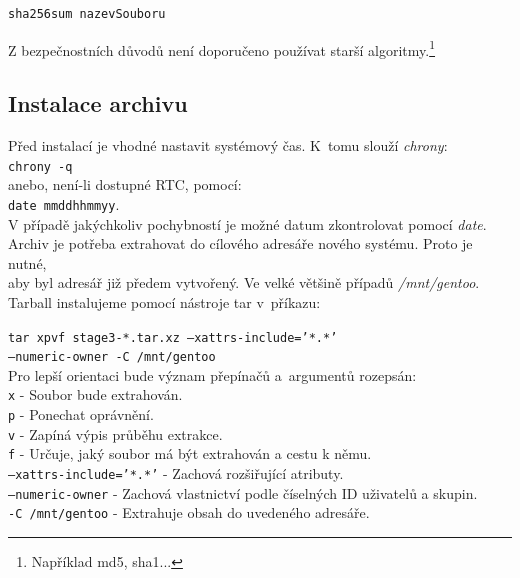 \documentclass[12pt,a4paper,twoside,]{article}
\begin{document}
{{{{{{{\texttt{sha256sum nazevSouboru}

\hspace{-1.5em}Z bezpečnostních důvodů není doporučeno používat starší algoritmy.\footnote{Například md5, sha1...}

\newpage
\subsection{\textsf{Instalace archivu}}
Před instalací je vhodné nastavit systémový čas. K~tomu slouží \textit{chrony}:\\
\hspace*{1.5em}\texttt{chrony -q}\\
 anebo, není-li dostupné RTC, pomocí: \\ \hspace*{1.5em}\texttt{date mmddhhmmyy}.\\
 
V případě jakýchkoliv pochybností je možné datum zkontrolovat pomocí \textit{date}.
\\Archiv je potřeba extrahovat do cílového adresáře nového systému. Proto je nutné,\\
aby byl adresář již předem vytvořený. Ve velké většině případů \textit{/mnt/gentoo}.\\
Tarball instalujeme pomocí nástroje tar v~příkazu:

\texttt{tar xpvf stage3-*.tar.xz --xattrs-include='*.*' \\\hspace*{1.5em}--numeric-owner -C /mnt/gentoo}\\

\hspace{-1.5em}Pro lepší orientaci bude význam přepínačů a~argumentů rozepsán:\\

\texttt{x} - Soubor bude extrahován.\\
\hspace*{1.5em}\texttt{p} - Ponechat oprávnění. \\
\hspace*{1.5em}\texttt{v} - Zapíná výpis průběhu extrakce.\\
\hspace*{1.5em}\texttt{f} - Určuje, jaký soubor má být extrahován a cestu k němu.\\
\hspace*{1.5em}\texttt{--xattrs-include='*.*'} - Zachová rozšiřující atributy.\\
\hspace*{1.5em}\texttt{--numeric-owner} - Zachová vlastnictví podle číselných ID uživatelů a
skupin.\\
\hspace*{1.5em}\texttt{-C /mnt/gentoo} - Extrahuje obsah do uvedeného adresáře.\\



}}}}}}}
\end{document}
